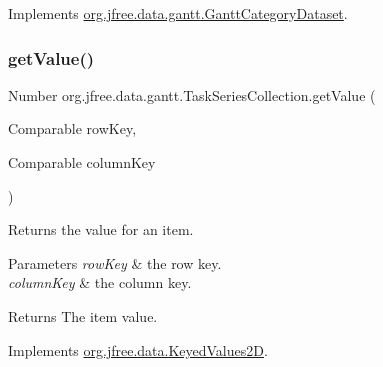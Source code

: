 Implements \mbox{\hyperlink{interfaceorg_1_1jfree_1_1data_1_1gantt_1_1_gantt_category_dataset_af4749dc6ab0b5b67535b4ea0fa88f190}{org.\+jfree.\+data.\+gantt.\+Gantt\+Category\+Dataset}}.

\mbox{\label{classorg_1_1jfree_1_1data_1_1gantt_1_1_task_series_collection_a89f6f1df4d88768e84b3bd313cbd3eab}} 
\subsubsection{\texorpdfstring{get\+Value()}{getValue()}\hspace{0.1cm}{\footnotesize\ttfamily [1/2]}}
{\footnotesize\ttfamily Number org.\+jfree.\+data.\+gantt.\+Task\+Series\+Collection.\+get\+Value (\begin{DoxyParamCaption}\item[{Comparable}]{row\+Key,  }\item[{Comparable}]{column\+Key }\end{DoxyParamCaption})}

Returns the value for an item.


\begin{DoxyParams}{Parameters}
{\em row\+Key} & the row key. \\
\hline
{\em column\+Key} & the column key.\\
\hline
\end{DoxyParams}
\begin{DoxyReturn}{Returns}
The item value. 
\end{DoxyReturn}


Implements \mbox{\hyperlink{interfaceorg_1_1jfree_1_1data_1_1_keyed_values2_d_a61c450ca108cd99e53174fc91393a99a}{org.\+jfree.\+data.\+Keyed\+Values2D}}.

\mbox{\label{classorg_1_1jfree_1_1data_1_1gantt_1_1_task_series_collection_ab786a9bbf3021d71aa0324257401ec8c}} 
